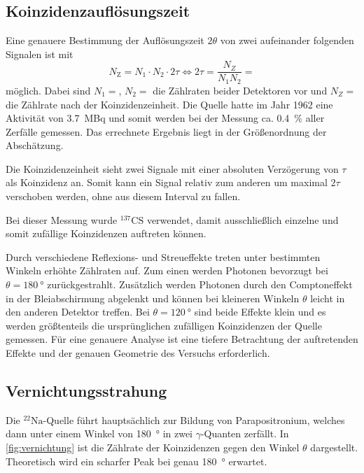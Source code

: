 \subsection{Koinzidenzauflösungszeit}
	
	Eine genauere Bestimmung der Auflösungszeit $2\theta$ von zwei aufeinander folgenden Signalen ist mit
	\begin{equation}
		N_\text{Z} = N_1 \cdot N_2 \cdot 2\tau \Leftrightarrow 2\tau = \frac{N_Z}{N_1 N_2} = 
	\end{equation}
	möglich.
	Dabei sind $N_1 = $, $N_2 = $ die Zählraten beider Detektoren vor und $N_Z = $ die Zählrate nach der Koinzidenzeinheit.
	Die Quelle hatte im Jahr 1962 eine Aktivität von \SI{3.7}{\mega\becquerel} und somit werden bei der Messung ca. \SI{0.4}{\%} aller Zerfälle gemessen.
	Das errechnete Ergebnis liegt in der Größenordnung der Abschätzung.

	Die Koinzidenzeinheit sieht zwei Signale mit einer absoluten Verzögerung von $\tau$ als Koinzidenz an.
	Somit kann ein Signal relativ zum anderen um maximal $2 \tau$ verschoben werden, ohne aus diesem Interval zu fallen.
	
	Bei dieser Messung wurde $^{137}\text{CS}$ verwendet, damit ausschließlich einzelne und somit zufällige Koinzidenzen auftreten können.
	
	Durch verschiedene Reflexions- und Streueffekte treten unter bestimmten Winkeln erhöhte Zählraten auf.
	Zum einen werden Photonen bevorzugt bei $\theta = \SI{180}{\degree}$ zurückgestrahlt.
	Zusätzlich werden Photonen durch den Comptoneffekt in der Bleiabschirmung abgelenkt und können bei kleineren Winkeln $\theta$ leicht in den anderen Detektor treffen.
	Bei $\theta = \SI{120}{\degree}$ sind beide Effekte klein und es werden größtenteils die ursprünglichen zufälligen Koinzidenzen der Quelle gemessen.
	Für eine genauere Analyse ist eine tiefere Betrachtung der auftretenden Effekte und der genauen Geometrie des Versuchs erforderlich.
		
\subsection{Vernichtungsstrahung}

	Die $^{22}\text{Na}$-Quelle führt hauptsächlich zur Bildung von Parapositronium, welches dann unter einem Winkel von \SI{180}{\degree} in zwei $\gamma$-Quanten zerfällt.
	In \cref{fig:vernichtung} ist die Zählrate der Koinzidenzen gegen den Winkel $\theta$ dargestellt.
	Theoretisch wird ein scharfer Peak bei genau \SI{180}{\degree} erwartet.
	
